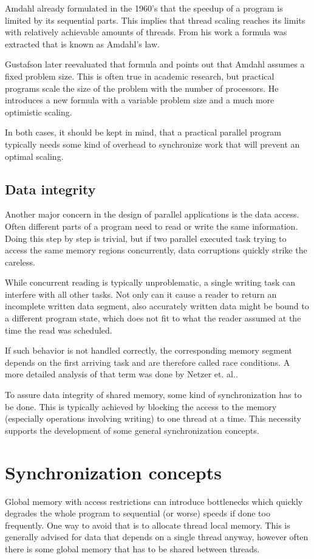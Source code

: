 Amdahl already formulated in the 1960's\cite{amdahl1967validity} that the speedup of a program is limited by its sequential parts. This implies that thread scaling reaches its limits with relatively achievable amounts of threads. From his work a formula was extracted that is known as Amdahl's law. 

Gustafson later reevaluated that formula\cite{gustafson1988reevaluating} and points out that Amdahl assumes a fixed problem size. This is often true in academic research, but practical programs scale the size of the problem with the number of processors. He introduces a new formula with a variable problem size and a much more optimistic scaling.

In both cases, it should be kept in mind, that a practical parallel program typically needs some kind of overhead to synchronize work that will prevent an optimal scaling. 

\subsection{Data integrity}
Another major concern in the design of parallel applications is the data access. Often different parts of a program need to read or write the same information. Doing this step by step is trivial, but if two parallel executed task trying to access the same memory regions concurrently, data corruptions quickly strike the careless.

While concurrent reading is typically unproblematic, a single writing task can interfere with all other tasks. Not only can it cause a reader to return an incomplete written data segment, also accurately written data might be bound to a different program state, which does not fit to what the reader assumed at the time the read was scheduled.

If such behavior is not handled correctly, the corresponding memory segment depends on the first arriving task and are therefore called race conditions. A more detailed analysis of that term was done by Netzer et. al.\cite{netzer1992race}.

To assure data integrity of shared memory, some kind of synchronization has to be done. This is typically achieved by blocking the access to the memory (especially operations involving writing) to one thread at a time. This necessity supports the development of some general synchronization concepts.

\section{Synchronization concepts}
Global memory with access restrictions can introduce bottlenecks which quickly degrades the whole program to sequential (or worse) speeds if done too frequently. One way to avoid that is to allocate thread local memory. This is generally advised for data that depends on a single thread anyway, however often there is some global memory that has to be shared between threads.

